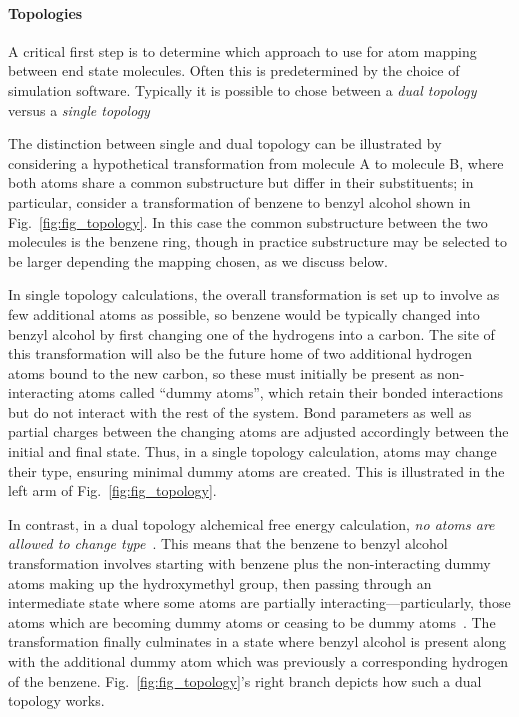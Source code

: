 \documentclass[9pt,bestpractices,pubversion]{livecoms}
\begin{document}
\paragraph{Topologies} 
A critical first step is to determine which approach to use for atom mapping between end state molecules. Often this is predetermined by the choice of simulation software. Typically it is possible to chose between a \emph{dual topology} versus a \emph{single topology}

The distinction between single and dual topology can be illustrated by considering a hypothetical transformation from molecule A to molecule B, where both atoms share a common substructure but differ in their substituents; in particular, consider a transformation of benzene to benzyl alcohol shown in Fig.~\ref{fig:fig_topology}.
In this case the common substructure between the two molecules is the benzene ring, though in practice substructure may be selected to be larger depending the mapping chosen, as we discuss below.

In single topology calculations, the overall transformation is set up to involve as few additional atoms as possible, so benzene would be typically changed into benzyl alcohol by first changing one of the hydrogens into a carbon. The site of this transformation will also be the future home of two additional hydrogen atoms bound to the new carbon, so these must initially be present as non-interacting atoms called ``dummy atoms'', which retain their bonded interactions but do not interact with the rest of the system.  Bond parameters as well as partial charges between the changing atoms are adjusted accordingly between the initial and final state. 
Thus, in a single topology calculation, atoms may change their type, ensuring minimal dummy atoms are created. This is illustrated in the left arm of Fig.~\ref{fig:fig_topology}. 

In contrast, in a dual topology alchemical free energy calculation, \emph{no atoms are allowed to change type}~\cite{boresch1999role, shirts2012best}. This means that the benzene to benzyl alcohol transformation involves starting with benzene plus the non-interacting dummy atoms making up the hydroxymethyl group, then passing through an intermediate state where some atoms are partially interacting---particularly, those atoms which are becoming dummy atoms or ceasing to be dummy atoms~\cite{mobley2014blind}. The transformation finally culminates in a state where benzyl alcohol is present along with the additional dummy atom which was previously a corresponding hydrogen of the benzene. Fig.~\ref{fig:fig_topology}'s right branch depicts how such a dual topology works. 
\end{document}
